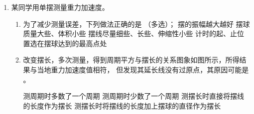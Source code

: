\begin{enumerate}
\item
某同学用单摆测量重力加速度。
\begin{enumerate}
\item
为了减少测量误差，下列做法正确的是 \underlinegap （多选）；
\fourchoices
{摆的振幅越大越好}
{摆球质量大些、体积小些}
{摆线尽量细些、长些、伸缩性小些}
{计时的起、止位置选在摆球达到的最高点处}

\item 
改变摆长，多次测量，得到周期平方与摆长的关系图象如图所示，所得结果与当地重力加速度值相符，
但发现其延长线没有过原点，其原因可能是 \underlinegap 。
\begin{figure}[h!]
\centering

\end{figure}

\fourchoices
{测周期时多数了一个周期}
{测周期时少数了一个周期}
{测摆长时直接将摆线的长度作为摆长}
{测摆长时将摆线的长度加上摆球的直径作为摆长}


\end{enumerate}





\end{enumerate}
